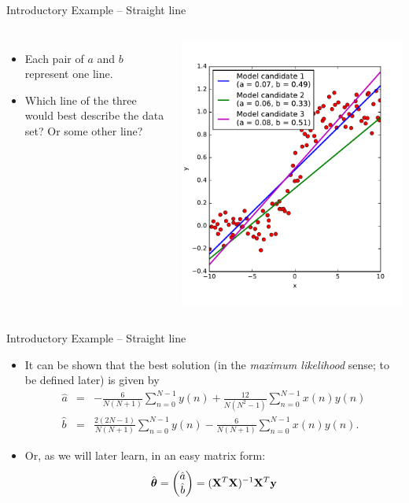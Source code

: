 \documentclass[10pt, aspectratio=169]{beamer} %
\newcommand{\thb}{\boldsymbol{\theta}}
\newcommand{\X}{{\bf X}}
\newcommand{\y}{{\bf y}}
\begin{document}
\begin{frame}[allowframebreaks=0.8]{Introductory Example -- Straight line}
\begin{columns}
\begin{itemize}
\item Each pair of $a$ and $b$ represent one line.
\item Which line of the three would best describe the data set? 
Or some other line?
\end{itemize}
\centerline{\includegraphics[width=\textwidth]{LSEx1.pdf}}
\end{columns}
\end{frame}

\begin{frame}[allowframebreaks=0.8]{Introductory Example -- Straight line}
\begin{itemize}
\item It can be shown that the best solution (in the \emph{maximum likelihood} sense; 
to be defined later) is given by
\begin{eqnarray*}
\hat{a} &=& - \frac{6}{N(N+1)}\sum_{n=0}^{N-1}y(n) + \frac{12}{N(N^2-1)}\sum_{n=0}^{N-1}x(n)y(n)\\
\hat{b} &=& \frac{2(2N-1)}{N(N+1)}\sum_{n=0}^{N-1}y(n) - \frac{6}{N(N+1)}\sum_{n=0}^{N-1}x(n)y(n).
\label{eq:optLinModel}
\end{eqnarray*}
\item Or, as we will later learn, in an easy matrix form: 
\[
\hat{\thb} = 
\begin{pmatrix}\hat{a}\\ \hat{b}\end{pmatrix}
= (\X^T\X)^{-1}\X^T\y
\]
\end{itemize}
\end{frame}
\end{document}
